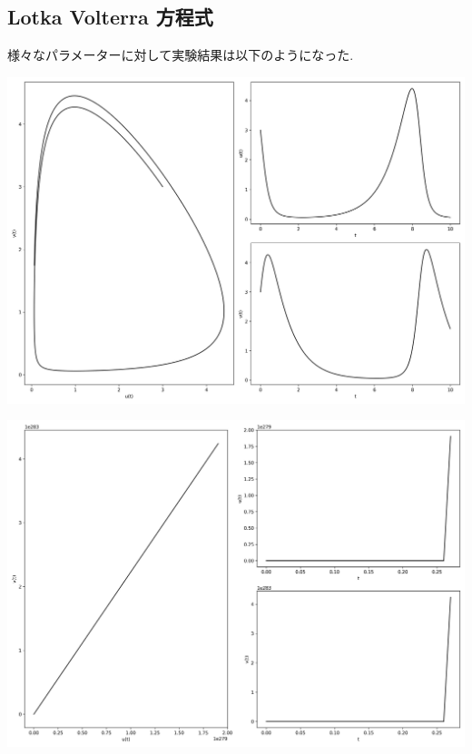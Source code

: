 \documentclass[12pt,a4paper]{jsarticle}
\makeatletter
\def\figcaption{\def\@captype{figure}\caption}
\makeatother
\begin{document}
\figcaption{$x_0=3.00, y_0=3.00, \mu=1,00, \omega=1.00, T = 100, N = 10000$}

\subsection{Lotka Volterra 方程式}
様々なパラメーターに対して実験結果は以下のようになった.

\includegraphics[scale=0.33]{u3,0v3,0a11,0b10,0c1-1,0a2-1,0b21,0c20,0t1,00e+01n1,00e+03.png}
\figcaption{$u_0=3.00, v_0=3.00, a_1=1.00, b_1=0.00, c_1=-1.00, a_2=-1.00, b_2=0.00, c_2=0.00, T = 10, N = 1000$}
\includegraphics[scale=0.33]{u3,0v3,0a11,9b10,0c1-1,9a21,9b20,0c21,9t1,00e+01n1,00e+03.png}
\figcaption{$u_0=3.00, v_0=3.00, a_1=1.90, b_1=0.00, c_1=-1.90, a_2=1.90, b_2=0.00, c_2=1.90, T = 10, N = 1000$}
\end{document}
